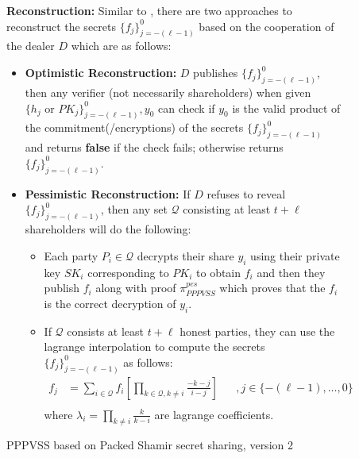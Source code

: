 \begin{figure}[t!]
{\begin{tcolorbox}[title=\textbf{PPPVSS based on Packed Shamir secret sharing \ref{sec:packed-shamir}}, width=1.2\textwidth, colframe=blue!75!black, colback=blue!10, sharp corners]
        \vspace{0.5em}
        \textbf{Reconstruction:}
            Similar to \cite{cryptoeprint:2025/576}, there are two approaches to reconstruct the secrets 
            $\{f_j\}_{j=-(\ell-1)}^0$ based on the cooperation of the dealer $D$ which are as follows:
            \begin{itemize}
                \item \textbf{Optimistic Reconstruction:} $D$ publishes $\{f_j\}_{j=-(\ell-1)}^0$, then any verifier (not necessarily shareholders) 
                when given $\{h_j\text{ or }PK_j\}_{j=-(\ell-1)}^0,y_0$ can check if $y_0$ is the valid product of the commitment(/encryptions) 
                of the secrets $\{f_j\}_{j=-(\ell-1)}^0$ and returns \textbf{false} if the check fails; otherwise returns 
                $\{f_j\}_{j=-(\ell-1)}^0$.
                \item \textbf{Pessimistic Reconstruction:} If $D$ refuses to reveal $\{f_j\}_{j=-(\ell-1)}^0$, then any set 
                $\mathcal{Q}$ consisting at least $t+\ell$ shareholders will do the following:
                \begin{itemize}
                    \item Each party $P_i\in\mathcal{Q}$ decrypts their share $y_i$ using their private key $SK_i$ 
                      corresponding to $PK_i$ to obtain $f_i$ and then they publish $f_i$ 
                      along with proof $\pi_{PPPVSS}^{pes}$ which proves that the $f_i$ is the correct 
                      decryption of $y_i$.
                    \item If $\mathcal{Q}$ consists at least $t+\ell$ honest parties, they can use the 
                    lagrange interpolation to compute the secrets $\{f_j\}_{j=-(\ell-1)}^0$ as follows:
                    \begin{align*}
                        f_j &= \sum_{i\in \mathcal{Q}} f_i \left[\prod_{k\in \mathcal{Q}, k\neq i}\frac{-k-j}{i-j}\right] &&, j\in\{-(\ell-1),\dots,0\} \\
                    \end{align*}
                    where $\lambda_i=\prod_{k\neq i}\frac{k}{k-i}$ are lagrange coefficients.
                \end{itemize}
            \end{itemize}
    \end{tcolorbox}
    }
    \caption[PPPVSS Scheme]{PPPVSS based on Packed Shamir secret sharing, version 2}
    \label{fig:packed-shamir-PPPVSS}
\end{figure}